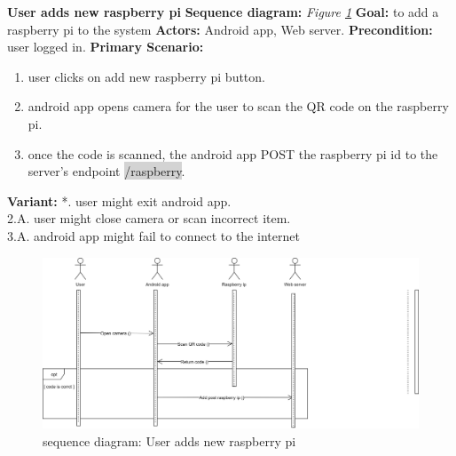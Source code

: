 \documentclass[12pt, oneside, a4paper]{book}
\newcommand{\code}[1]{{\color{red}\colorbox{lightgray}{#1}}}
\newcommand\boldcolor[1]{\textcolor{bold}{\textbf{#1}}}
\begin{document}
				\newpage\hspace*{-6mm}\boldcolor{User adds new raspberry pi}
				\newline\textbf{Sequence diagram:} \textit{Figure \ref{user_rp}}
				\newline\textbf{Goal:} to add a raspberry pi to the system
				\newline\textbf{Actors:} Android app, Web server.
				\newline\textbf{Precondition:} user logged in.
				\newline\textbf{Primary Scenario:}	
				\begin{enumerate}[label*=\arabic*.]
					\item user clicks on add new raspberry pi button.
					\item android app opens camera for the user to scan the QR code on the raspberry pi.
					\item once the code is scanned, the android app POST the raspberry pi id to the server's endpoint \code{/raspberry}.
				\end{enumerate}
				\textbf{Variant:}\newline
				\hspace*{5mm}*. user might exit android app. \\
				\hspace*{5mm}2.A. user might close camera or scan incorrect item. \\
				\hspace*{5mm}3.A. android app might fail to connect to the internet \\
				\begin{figure}[H]
					\includegraphics[width=\linewidth]{img/sequence_user_rp.png}
					\caption{sequence diagram: User adds new raspberry pi}
					\label{user_rp}
				\end{figure}
			
\end{document}
